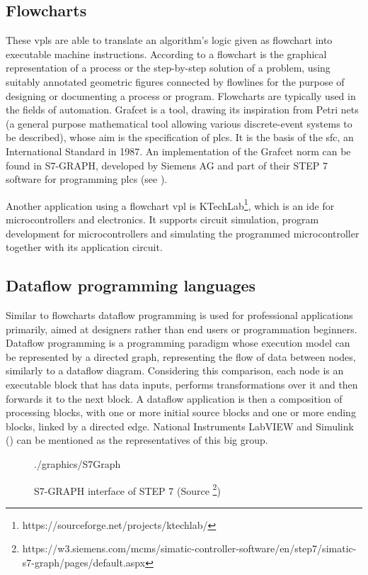 \subsection{Flowcharts}
These \glspl{vpl} are able to translate an algorithm's logic given as flowchart into executable machine instructions. According to \cite{ISO2382} a flowchart is the graphical representation of a process or the step-by-step solution of a problem, using suitably annotated geometric figures connected by flowlines for the purpose of designing or documenting a process or program. Flowcharts are typically used in the fields of automation. Grafcet \cite{Grafcet} is a tool, drawing its inspiration from Petri nets (a general purpose mathematical tool allowing various discrete-event systems to be described), whose aim is the specification of \glspl{plc}. It is the basis of the \gls{sfc}, an International Standard in 1987. An implementation of the Grafcet norm can be found in S7-GRAPH, developed by Siemens AG and part of their STEP 7 software for programming \glspl{plc} (see ).

Another application using a flowchart \gls{vpl} is KTechLab\footnote{https://sourceforge.net/projects/ktechlab/}, which is an \gls{ide} for microcontrollers and electronics. It supports circuit simulation, program development for microcontrollers and simulating the programmed microcontroller together with its application circuit.

\subsection{Dataflow programming languages}
Similar to flowcharts dataflow programming is used for professional applications primarily, aimed at designers rather than end users or programmation beginners. Dataflow programming is a programming paradigm whose execution model can be represented by a directed graph, representing the flow of data between nodes, similarly to a dataflow diagram. Considering this comparison, each node is an executable block that has data inputs, performs transformations over it and then forwards it to the next block. A dataflow application is then a composition of processing blocks, with one or more initial source blocks and one or more ending blocks, linked by a directed edge.\cite{Sousa2012DataflowPC} National Instruments LabVIEW \cite{LabView} and Simulink () can be mentioned as the representatives of this big group.

\begin{figure}[ht]
	\centering
	\begin{overpic}[width=0.65\linewidth]{./graphics/S7Graph}
	\end{overpic}
    \caption[S7-GRAPH interface of  STEP 7]%
        {S7-GRAPH interface of  STEP 7 (Source \footnote{https://w3.siemens.com/mcms/simatic-controller-software/en/step7/simatic-s7-graph/pages/default.aspx})}
	\label{fig:S7Graph}%
\end{figure}

